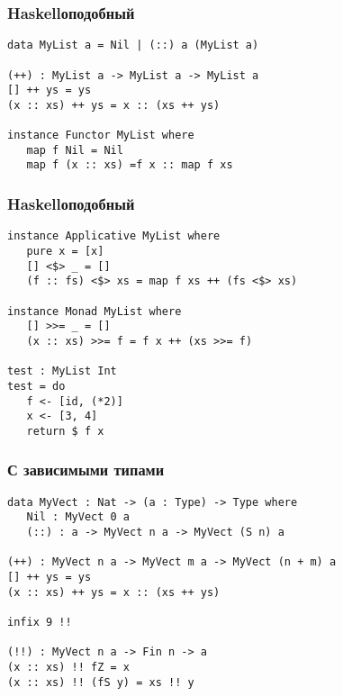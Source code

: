 
\begin{frame}[fragile]
   \frametitle{Haskellоподобный}
   \begin{lstlisting}
data MyList a = Nil | (::) a (MyList a)

(++) : MyList a -> MyList a -> MyList a
[] ++ ys = ys
(x :: xs) ++ ys = x :: (xs ++ ys)

instance Functor MyList where
   map f Nil = Nil
   map f (x :: xs) =f x :: map f xs
   \end{lstlisting}
\end{frame}

\begin{frame}[fragile]
   \frametitle{Haskellоподобный}
   \begin{lstlisting}
instance Applicative MyList where
   pure x = [x]
   [] <$> _ = []
   (f :: fs) <$> xs = map f xs ++ (fs <$> xs)

instance Monad MyList where
   [] >>= _ = []
   (x :: xs) >>= f = f x ++ (xs >>= f)

test : MyList Int
test = do
   f <- [id, (*2)]
   x <- [3, 4]
   return $ f x
   \end{lstlisting}
\end{frame}

\begin{frame}[fragile]
   \frametitle{С зависимыми типами}
   \begin{lstlisting}
data MyVect : Nat -> (a : Type) -> Type where
   Nil : MyVect 0 a
   (::) : a -> MyVect n a -> MyVect (S n) a

(++) : MyVect n a -> MyVect m a -> MyVect (n + m) a
[] ++ ys = ys
(x :: xs) ++ ys = x :: (xs ++ ys)

infix 9 !!

(!!) : MyVect n a -> Fin n -> a
(x :: xs) !! fZ = x
(x :: xs) !! (fS y) = xs !! y
   \end{lstlisting}
\end{frame}


